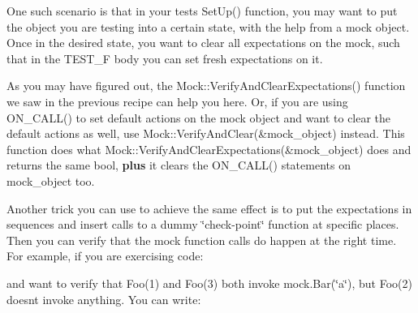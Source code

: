 One such scenario is that in your test\textquotesingle{}s {\ttfamily Set\+Up()} function, you may want to put the object you are testing into a certain state, with the help from a mock object. Once in the desired state, you want to clear all expectations on the mock, such that in the {\ttfamily T\+E\+S\+T\+\_\+F} body you can set fresh expectations on it.

As you may have figured out, the {\ttfamily Mock\+::\+Verify\+And\+Clear\+Expectations()} function we saw in the previous recipe can help you here. Or, if you are using {\ttfamily O\+N\+\_\+\+C\+A\+L\+L()} to set default actions on the mock object and want to clear the default actions as well, use {\ttfamily Mock\+::\+Verify\+And\+Clear(\&mock\+\_\+object)} instead. This function does what {\ttfamily Mock\+::\+Verify\+And\+Clear\+Expectations(\&mock\+\_\+object)} does and returns the same {\ttfamily bool}, {\bfseries{plus}} it clears the {\ttfamily O\+N\+\_\+\+C\+A\+L\+L()} statements on {\ttfamily mock\+\_\+object} too.

Another trick you can use to achieve the same effect is to put the expectations in sequences and insert calls to a dummy \char`\"{}check-\/point\char`\"{} function at specific places. Then you can verify that the mock function calls do happen at the right time. For example, if you are exercising code\+:


\begin{DoxyCode}{0}
\end{DoxyCode}


and want to verify that {\ttfamily Foo(1)} and {\ttfamily Foo(3)} both invoke {\ttfamily mock.\+Bar(\char`\"{}a\char`\"{})}, but {\ttfamily Foo(2)} doesn\textquotesingle{}t invoke anything. You can write\+:


\begin{DoxyCode}{0}
\DoxyCodeLine{}
\DoxyCodeLine{  \{}
\DoxyCodeLine{}
\DoxyCodeLine{  \}}
\DoxyCodeLine{\}}
\end{DoxyCode}


